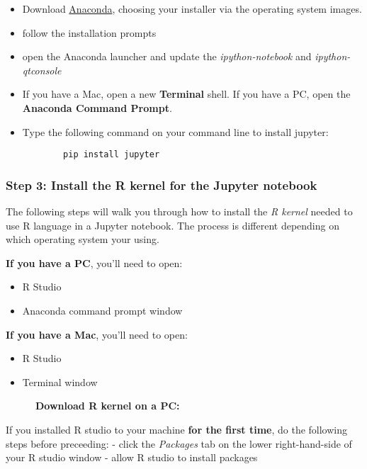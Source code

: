 \documentclass{article}
\providecommand{\tightlist}{%
      \setlength{\itemsep}{0pt}\setlength{\parskip}{0pt}}
\begin{document}
    \begin{itemize}
\item
  Download \href{http://continuum.io/downloads\#py34}{Anaconda},
  choosing your installer via the operating system images.
\item
  follow the installation prompts
\item
  open the Anaconda launcher and update the \emph{ipython-notebook} and
  \emph{ipython-qtconsole}
\item
  If you have a Mac, open a new \textbf{Terminal} shell. If you have a
  PC, open the \textbf{Anaconda Command Prompt}.
\item
  Type the following command on your command line to install jupyter:

\begin{verbatim}
        pip install jupyter
\end{verbatim}
\end{itemize}

    \subsubsection{Step 3: Install the R kernel for the Jupyter
notebook}\label{step-3-install-the-r-kernel-for-the-jupyter-notebook}

The following steps will walk you through how to install the \emph{R
kernel} needed to use R language in a Jupyter notebook. The process is
different depending on which operating system your using.

\textbf{If you have a PC}, you'll need to open:

\begin{itemize}
\tightlist
\item
  R Studio
\item
  Anaconda command prompt window
\end{itemize}

\textbf{If you have a Mac}, you'll need to open:

\begin{itemize}
\tightlist
\item
  R Studio
\item
  Terminal window
\end{itemize}

~~~~~~\textbf{Download R kernel on a PC:}

If you installed R studio to your machine \textbf{for the first time},
do the following steps before preceeding: - click the \emph{Packages}
tab on the lower right-hand-side of your R studio window - allow R
studio to install packages
\end{document}
